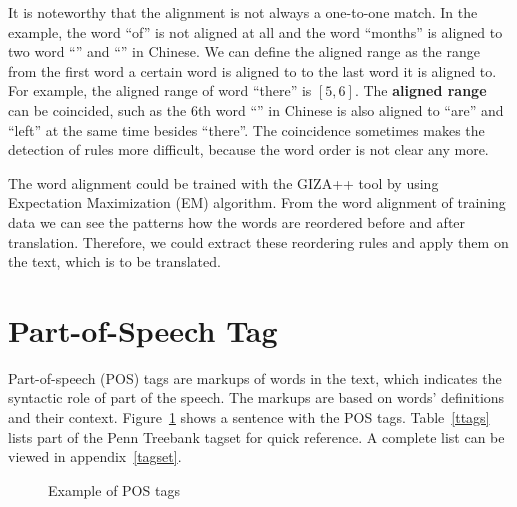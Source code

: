 \label{alignedrange}
It is noteworthy that the alignment is not always a one-to-one match. In the example, the word ``of'' is not aligned at all and the word ``months'' is aligned to two word ``'' and ``'' in Chinese. We can define the aligned range as the range from the first word a certain word is aligned to to the last word it is aligned to. For example, the aligned range of word ``there'' is $[5,6]$. The \textbf{aligned range} can be coincided, such as the $6$th word ``'' in Chinese is also aligned to ``are'' and ``left'' at the same time besides ``there''. The coincidence sometimes makes the detection of rules more difficult, because the word order is not clear any more.

The word alignment could be trained with the GIZA++ tool by using Expectation Maximization (EM) algorithm. From the word alignment of training data we can see the patterns how the words are reordered before and after translation. Therefore, we could extract these reordering rules and apply them on the text, which is to be translated.

\section{Part-of-Speech Tag}

Part-of-speech (POS) tags are markups of words in the text, which indicates the syntactic role of part of the speech. The markups are based on words' definitions and their context. Figure~\ref{tags} shows a sentence with the POS tags. Table~\ref{ttags} lists part of the Penn Treebank tagset for quick reference. A complete list can be viewed in appendix~\ref{tagset}.

\begin{figure}[H]

\centering

\caption{Example of POS tags}
\label{tags}
\end{figure}

